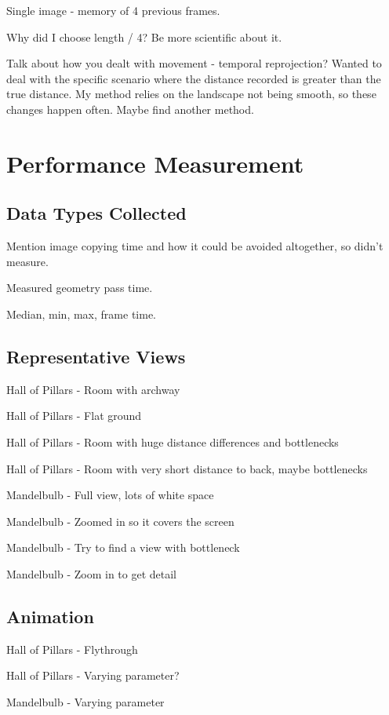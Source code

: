 Single image - memory of 4 previous frames.

Why did I choose length / 4? Be more scientific about it.

Talk about how you dealt with movement - temporal reprojection? Wanted to deal with the specific scenario where the distance recorded is greater than the true distance. My method relies on the landscape not being smooth, so these changes happen often. Maybe find another method.

\section{Performance Measurement}

\subsection{Data Types Collected}

Mention image copying time and how it could be avoided altogether, so didn't measure.

Measured geometry pass time.

Median, min, max, frame time.

\subsection{Representative Views}

Hall of Pillars - Room with archway

Hall of Pillars - Flat ground

Hall of Pillars - Room with huge distance differences and bottlenecks

Hall of Pillars - Room with very short distance to back, maybe bottlenecks

Mandelbulb - Full view, lots of white space

Mandelbulb - Zoomed in so it covers the screen

Mandelbulb - Try to find a view with bottleneck

Mandelbulb - Zoom in to get detail

\subsection{Animation}

Hall of Pillars - Flythrough

Hall of Pillars - Varying parameter?

Mandelbulb - Varying parameter

